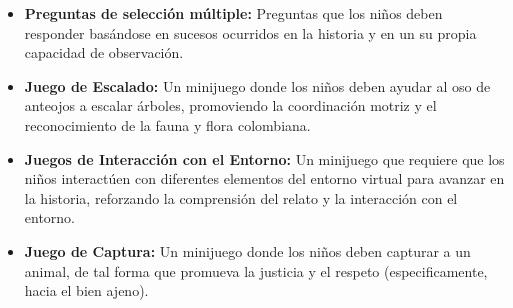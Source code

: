\begin{itemize}
    \item \textbf{Preguntas de selección múltiple:} Preguntas que los niños deben responder basándose en sucesos ocurridos en la historia y en un su propia capacidad de observación.
    \item \textbf{Juego de Escalado:} Un minijuego donde los niños deben ayudar al oso de anteojos a escalar árboles, promoviendo la coordinación motriz y el reconocimiento de la fauna y flora colombiana.
    \item \textbf{Juegos de Interacción con el Entorno:} Un minijuego que requiere que los niños interactúen con diferentes elementos del entorno virtual para avanzar en la historia, reforzando la comprensión del relato y la interacción con el entorno.
    \item \textbf{Juego de Captura:} Un minijuego donde los niños deben capturar a un animal, de tal forma que promueva la justicia y el respeto (especificamente, hacia el bien ajeno).
\end{itemize}